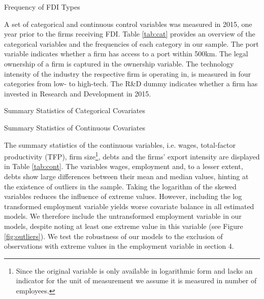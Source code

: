 \documentclass[a4paper,11pt]{scrartcl}
\begin{document}
\begin{table}[h!]
	\centering
	\caption{Frequency of FDI Types} 
	
\label{tab:freq}
\end{table}

A set of categorical and continuous control variables was measured in 2015, one year prior to the firms receiving FDI. Table \ref{tab:cat} provides an overview of the categorical variables and the frequencies of each category in our sample. %
The port variable indicates whether a firm has access to a port within 500km. The legal ownership of a firm is captured in the ownership variable. The technology intensity of the industry the respective firm is operating in, is measured in four categories from low- to high-tech. The R\&D dummy indicates whether a firm has invested in Research and Development in 2015. \\

\begin{table}[h!]
	\centering
	\caption{Summary Statistics of Categorical Covariates} 
	
	\label{tab:cat}	
\end{table}

\begin{table}[h!]
	\centering
	\caption{Summary Statistics of Continuous Covariates} 
	
	\label{tab:cont}
\end{table}
\newpage

The summary statistics of the continuous variables, i.e. wages,  total-factor productivity (TFP), firm size\footnote{Since the original variable is only available in logarithmic form and lacks an indicator for the unit of measurement we assume it is measured in number of employees.}, debts and the firms' export intensity are displayed in Table \ref{tab:cont}. The variables wages, employment and, to a lesser extent, debts show large differences between their mean and median values, hinting at the existence of outliers in the sample. Taking the logarithm of the skewed variables reduces the influence of extreme values. However, including the log transformed employment variable yields worse covariate balance in all estimated models. We therefore include the untransformed employment variable in our models, despite noting at least one extreme value in this variable (see Figure \ref{fig:outliers}). We test the robustness of our models to the exclusion of observations with extreme values in the employment variable in section 4.
\end{document}
